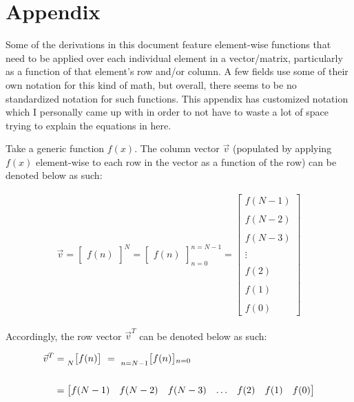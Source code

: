 \documentclass{article}
\begin{document}
\section {Appendix}

Some of the derivations in this document feature element-wise functions that need to be applied over each individual element in a vector/matrix, particularly as a function of that element's row and/or column. A few fields use some of their own notation for this kind of math, but overall, there seems to be no standardized notation for such functions. This appendix has customized notation which I personally came up with in order to not have to waste a lot of space trying to explain the equations in here. \newline

Take a generic function $f(x)$. The column vector $\vec{v}$ (populated by applying $f(x)$ element-wise to each row in the vector as a function of the row) can be denoted below as such:

\begin{align*}
    \vec{v} = \begin{bmatrix} f(n) \end{bmatrix}^{N}
            = \begin{bmatrix} f(n) \end{bmatrix}^{n=N - 1}_{n=0}
            = \begin{bmatrix}
                    f(N - 1) \\ \\
                    f(N - 2) \\ \\
                    f(N - 3) \\ \\
                      \vdots \\ \\
                    f(    2) \\ \\
                    f(    1) \\ \\
                    f(    0) 
                \end{bmatrix}
  \end{align*}

Accordingly, the row vector $\vec{v}^{T}$ can be denoted below as such:

\begin{align*}
    \vec{v}^{T}&=   \prescript{}{N}{\begin{bmatrix} f(n) \end{bmatrix}} \ 
                = \ \prescript{}{n=N - 1}{\begin{bmatrix} f(n) \end{bmatrix}}_{n=0} \\ \\
               &= \begin{bmatrix} f(N - 1) & f(N - 2) & f(N - 3) & \ldots & f(2) & f(1) & f(0) \end{bmatrix} \\
  \end{align*} 
\end{document}
